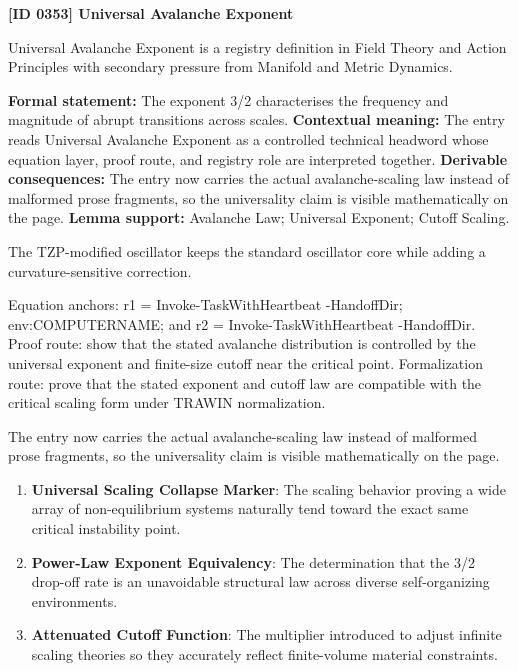 \clearpage
\noindent\textbf{[ID 0353] Universal Avalanche Exponent}\par
\vspace{0.35em}
\begingroup\small
{}
Universal Avalanche Exponent is a registry definition in Field Theory and Action Principles with secondary pressure from Manifold and Metric Dynamics.

\begingroup\footnotesize\setlength{\emergencystretch}{3em}\sloppy
\textbf{Formal statement:} The exponent 3/2 characterises the frequency and magnitude of abrupt transitions across scales. \textbf{Contextual meaning:} The entry reads Universal Avalanche Exponent as a controlled technical headword whose equation layer, proof route, and registry role are interpreted together. \textbf{Derivable consequences:} The entry now carries the actual avalanche-scaling law instead of malformed prose fragments, so the universality claim is visible mathematically on the page. \textbf{Lemma support:} Avalanche Law; Universal Exponent; Cutoff Scaling.\par
\endgroup

The TZP-modified oscillator keeps the standard oscillator core while adding a curvature-sensitive correction.

Equation anchors: r1 = Invoke-TaskWithHeartbeat -HandoffDir; env:COMPUTERNAME; and r2 = Invoke-TaskWithHeartbeat -HandoffDir. Proof route: show that the stated avalanche distribution is controlled by the universal exponent and finite-size cutoff near the critical point. Formalization route: prove that the stated exponent and cutoff law are compatible with the critical scaling form under TRAWIN normalization.

The entry now carries the actual avalanche-scaling law instead of malformed prose fragments, so the universality claim is visible mathematically on the page.
\endgroup

\begin{enumerate}[leftmargin=1.6em,itemsep=6pt,topsep=4pt]
\item \textbf{Universal Scaling Collapse Marker}: The scaling behavior proving a wide array of non-equilibrium systems naturally tend toward the exact same critical instability point.
\item \textbf{Power-Law Exponent Equivalency}: The determination that the 3/2 drop-off rate is an unavoidable structural law across diverse self-organizing environments.
\item \textbf{Attenuated Cutoff Function}: The multiplier introduced to adjust infinite scaling theories so they accurately reflect finite-volume material constraints.
\end{enumerate}


